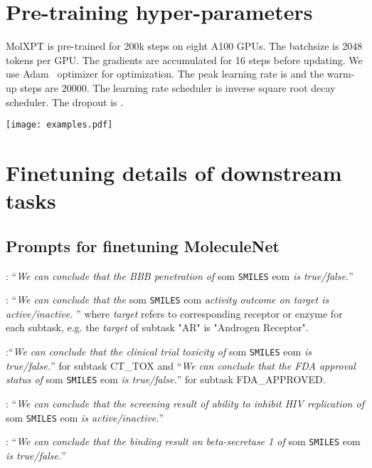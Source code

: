 \documentclass[11pt]{article}
\newcommand{\ourM}{MolXPT}
\newcommand{\som}{som}
\newcommand{\eom}{eom}
\begin{document}
\section{Pre-training hyper-parameters}
\label{app:pretrain_details}
\ourM{} is pre-trained for 200k steps on eight A100 GPUs. The batchsize is 2048 tokens per GPU. The gradients are accumulated for 16 steps before updating. We use Adam~\cite{adam} optimizer for optimization. The  peak learning rate is  and the warm-up steps are 20000. The learning rate scheduler is inverse square root decay scheduler. The dropout is . 


\begin{figure*}[!htbp] 
\centering
\texttt{[image: examples.pdf]}
\caption{Examples for zero-shot text-to-molecule generation. We randomly pick up three cases that \ourM{} can successfully generate the reference molecules without finetuning.}
\label{cases}
\end{figure*}

\section{Finetuning details of downstream tasks}
\label{sec:implementation}
\subsection{Prompts for finetuning MoleculeNet}
\label{sec:molnet_prompt}
: ``{\em We can conclude that the BBB penetration of }\som{} \texttt{SMILES} \eom{} {\em is true/false.}''

: ``{\em We can conclude that the }\som{} \texttt{SMILES} \eom{} {\em activity outcome on target is active/inactive.} '' where {\em target} refers to corresponding receptor or enzyme for each subtask, e.g. the {\em target} of subtask "AR" is "Androgen Receptor".

:``{\em We can conclude that the clinical trial toxicity of }\som{} \texttt{SMILES} \eom{} {\em is true/false.}'' for subtask CT\_TOX and ``{\em We can conclude that the FDA approval status of }\som{} \texttt{SMILES} \eom{} {\em is true/false.}'' for subtask FDA\_APPROVED.

: ``{\em We can conclude that the screening result of ability to inhibit HIV replication of }\som{} \texttt{SMILES} \eom{} {\em is active/inactive.}''

: ``{\em We can conclude that the binding result on beta-secretase 1 of }\som{} \texttt{SMILES} \eom{} {\em is true/false.}''
\end{document}
